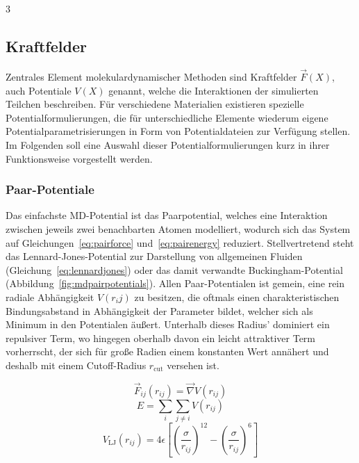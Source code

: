 3\subsection{Kraftfelder}
\label{mdforcefields}

Zentrales Element molekulardynamischer Methoden sind Kraftfelder $\vec F(X)$, auch Potentiale $V(X)$ genannt, welche die Interaktionen der simulierten Teilchen beschreiben.
Für verschiedene Materialien existieren spezielle Potentialformulierungen, die für unterschiedliche Elemente wiederum eigene Potentialparametrisierungen in Form von Potentialdateien zur Verfügung stellen.
Im Folgenden soll eine Auswahl dieser Potentialformulierungen kurz in ihrer Funktionsweise vorgestellt werden.

\subsubsection{Paar-Potentiale}

Das einfachste MD-Potential ist das Paarpotential, welches eine Interaktion zwischen jeweils zwei benachbarten Atomen modelliert, wodurch sich das System auf Gleichungen~\ref{eq:pairforce} und~\ref{eq:pairenergy} reduziert.
Stellvertretend steht das Lennard-Jones-Potential zur Darstellung von allgemeinen Fluiden (Gleichung~\ref{eq:lennardjones}) oder das damit verwandte Bucking\-ham-Potential (Abbildung~\ref{fig:mdpairpotentials}).
Allen Paar-Potentialen ist gemein, eine rein radiale Abhängigkeit $V(r_ij)$ zu besitzen, die oftmals einen charakteristischen Bindungsabstand in Abhängigkeit der Parameter bildet, welcher sich als Minimum in den Potentialen äußert.
Unterhalb dieses Radius' dominiert ein repulsiver Term, wo hingegen oberhalb davon ein leicht attraktiver Term vorherrscht, der sich für große Radien einem konstanten Wert annähert und deshalb mit einem Cutoff-Radius $r_\text{cut}$ versehen ist.

\begin{equation}
  \label{eq:pairforce}
  \vec F_{ij}(r_{ij}) = \vec\nabla V(r_{ij})
\end{equation}
\begin{equation}
  \label{eq:pairenergy}
  E = \sum_i\sum_{j \neq i}{V(r_{ij})}
\end{equation}
\begin{equation}
  \label{eq:lennardjones}
  V_\text{LJ}(r_{ij}) = 4 \epsilon \left[\left(\frac{\sigma}{r_{ij}}\right)^{12} - \left(\frac{\sigma}{r_{ij}}\right)^{6}\right]
\end{equation}

